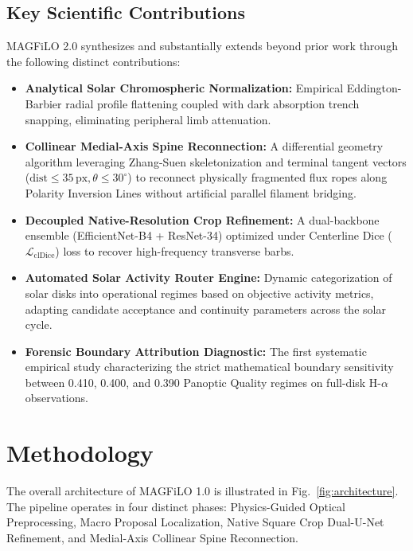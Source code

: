 \documentclass[conference]{IEEEtran}
\begin{document}
\subsection{Key Scientific Contributions}
MAGFiLO 2.0 synthesizes and substantially extends beyond prior work through the following distinct contributions:
\begin{itemize}
    \item \textbf{Analytical Solar Chromospheric Normalization:} Empirical Eddington-Barbier radial profile flattening coupled with dark absorption trench snapping, eliminating peripheral limb attenuation.
    \item \textbf{Collinear Medial-Axis Spine Reconnection:} A differential geometry algorithm leveraging Zhang-Suen skeletonization and terminal tangent vectors ($\text{dist} \le 35\,\text{px}, \theta \le 30^\circ$) to reconnect physically fragmented flux ropes along Polarity Inversion Lines without artificial parallel filament bridging.
    \item \textbf{Decoupled Native-Resolution Crop Refinement:} A dual-backbone ensemble (EfficientNet-B4 + ResNet-34) optimized under Centerline Dice ($\mathcal{L}_{\text{clDice}}$) loss to recover high-frequency transverse barbs.
    \item \textbf{Automated Solar Activity Router Engine:} Dynamic categorization of solar disks into operational regimes based on objective activity metrics, adapting candidate acceptance and continuity parameters across the solar cycle.
    \item \textbf{Forensic Boundary Attribution Diagnostic:} The first systematic empirical study characterizing the strict mathematical boundary sensitivity between 0.410, 0.400, and 0.390 Panoptic Quality regimes on full-disk H-$\alpha$ observations.
\end{itemize}

\section{Methodology}

The overall architecture of MAGFiLO 1.0 is illustrated in Fig.~\ref{fig:architecture}. The pipeline operates in four distinct phases: Physics-Guided Optical Preprocessing, Macro Proposal Localization, Native Square Crop Dual-U-Net Refinement, and Medial-Axis Collinear Spine Reconnection.
\end{document}

